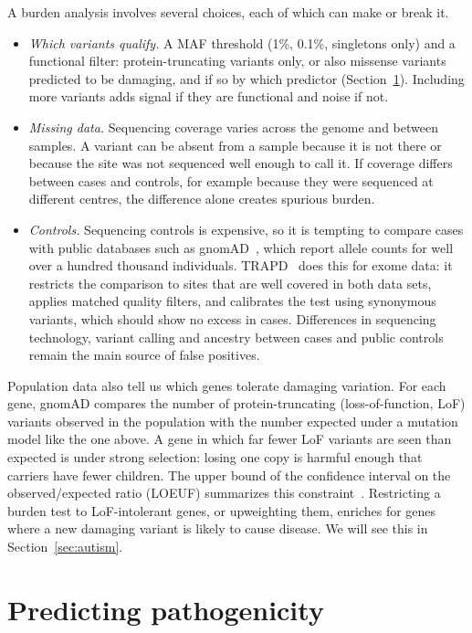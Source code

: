 A burden analysis involves several choices, each of which can make or break it.
\begin{itemize}
  \item \emph{Which variants qualify.} A MAF threshold (1\%, 0.1\%, singletons only) and a functional filter: protein-truncating variants only, or also missense variants predicted to be damaging, and if so by which predictor (Section~\ref{sec:pathogenicity}). Including more variants adds signal if they are functional and noise if not.
  \item \emph{Missing data.} Sequencing coverage varies across the genome and between samples. A variant can be absent from a sample because it is not there or because the site was not sequenced well enough to call it. If coverage differs between cases and controls, for example because they were sequenced at different centres, the difference alone creates spurious burden.
  \item \emph{Controls.} Sequencing controls is expensive, so it is tempting to compare cases with public databases such as gnomAD~\citep{karczewski2020}, which report allele counts for well over a hundred thousand individuals. TRAPD~\citep{guo2018} does this for exome data: it restricts the comparison to sites that are well covered in both data sets, applies matched quality filters, and calibrates the test using synonymous variants, which should show no excess in cases. Differences in sequencing technology, variant calling and ancestry between cases and public controls remain the main source of false positives.
\end{itemize}

Population data also tell us which genes tolerate damaging variation. For each gene, gnomAD compares the number of protein-truncating (loss-of-function, LoF) variants observed in the population with the number expected under a mutation model like the one above. A gene in which far fewer LoF variants are seen than expected is under strong selection: losing one copy is harmful enough that carriers have fewer children. The upper bound of the confidence interval on the observed/expected ratio (LOEUF) summarizes this constraint~\citep{karczewski2020}. Restricting a burden test to LoF-intolerant genes, or upweighting them, enriches for genes where a new damaging variant is likely to cause disease. We will see this in Section~\ref{sec:autism}.

\section{Predicting pathogenicity}
\label{sec:pathogenicity}

